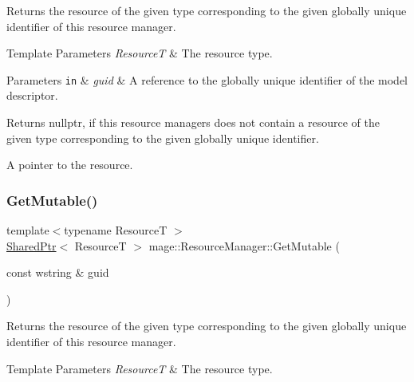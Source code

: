Returns the resource of the given type corresponding to the given globally unique identifier of this resource manager.


\begin{DoxyTemplParams}{Template Parameters}
{\em ResourceT} & The resource type. \\
\hline
\end{DoxyTemplParams}

\begin{DoxyParams}[1]{Parameters}
\mbox{\tt in}  & {\em guid} & A reference to the globally unique identifier of the model descriptor. \\
\hline
\end{DoxyParams}
\begin{DoxyReturn}{Returns}
{\ttfamily nullptr}, if this resource managers does not contain a resource of the given type corresponding to the given globally unique identifier. 

A pointer to the resource. 
\end{DoxyReturn}
\hypertarget{classmage_1_1_resource_manager_a4fb37f2f49e918e69e9acfe1ed0bb21b}{}\label{classmage_1_1_resource_manager_a4fb37f2f49e918e69e9acfe1ed0bb21b} 
\subsubsection{\texorpdfstring{Get\+Mutable()}{GetMutable()}}
{\footnotesize\ttfamily template$<$typename ResourceT $>$ \\
\hyperlink{namespacemage_a1e01ae66713838a7a67d30e44c67703e}{Shared\+Ptr}$<$ ResourceT $>$ mage\+::\+Resource\+Manager\+::\+Get\+Mutable (\begin{DoxyParamCaption}\item[{const wstring \&}]{guid }\end{DoxyParamCaption})\hspace{0.3cm}{\ttfamily [noexcept]}}

Returns the resource of the given type corresponding to the given globally unique identifier of this resource manager.


\begin{DoxyTemplParams}{Template Parameters}
{\em ResourceT} & The resource type. \\
\hline
\end{DoxyTemplParams}

